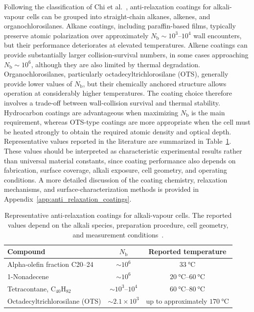 Following the classification of Chi et al.~\cite{Aiacoavc_ChiEtAl_2020}, anti-relaxation coatings for alkali-vapour cells can be grouped into straight-chain alkanes, alkenes, and organochlorosilanes. Alkane coatings, including paraffin-based films, typically preserve atomic polarization over approximately $N_{\mathrm{b}}\sim10^{3}$--$10^{4}$ wall encounters, but their performance deteriorates at elevated temperatures. Alkene coatings can provide substantially larger collision-survival numbers, in some cases approaching $N_{\mathrm{b}}\sim10^{6}$, although they are also limited by thermal degradation. Organochlorosilanes, particularly octadecyltrichlorosilane (OTS), generally provide lower values of $N_{\mathrm{b}}$, but their chemically anchored structure allows operation at considerably higher temperatures.
The coating choice therefore involves a trade-off between wall-collision survival and thermal stability. Hydrocarbon coatings are advantageous when maximizing $N_{\mathrm{b}}$ is the main requirement, whereas OTS-type coatings are more appropriate when the cell must be heated strongly to obtain the required atomic density and optical depth. Representative values reported in the literature are summarized in Table~\ref{tab:coating_comparison}. These values should be interpreted as characteristic experimental results rather than universal material constants, since coating performance also depends on fabrication, surface coverage, alkali exposure, cell geometry, and operating conditions. A more detailed discussion of the coating chemistry, relaxation mechanisms, and surface-characterization methods is provided in Appendix~\ref{app:anti_relaxation_coatings}.
\begin{table}[htbp]
\centering
\begin{tabular}{lcc}
\hline
\textbf{Compound} & \textbf{$N_{\mathrm{b}}$} & \textbf{Reported temperature} \\
\hline
Alpha-olefin fraction C20--24
& $\sim 10^{6}$
& $\SI{33}{\degreeCelsius}$ \\
   1-Nonadecene
    & $\sim 10^{6}$
    & $\SIrange{20}{60}{\degreeCelsius}$ \\

    Tetracontane, $\mathrm{C}_{40}\mathrm{H}_{82}$
    & $\sim 10^{3}$--$10^{4}$
    & $\SIrange{60}{80}{\degreeCelsius}$ \\

    Octadecyltrichlorosilane (OTS)
    & $\sim 2.1\times10^{3}$
    & up to approximately $\SI{170}{\degreeCelsius}$ \\
    \hline
\end{tabular}
\caption{Representative anti-relaxation coatings for alkali-vapour cells. The reported values depend on the alkali species, preparation procedure, cell geometry, and measurement conditions~\cite{Aiacoavc_ChiEtAl_2020}.}
\label{tab:coating_comparison}

\end{table}



